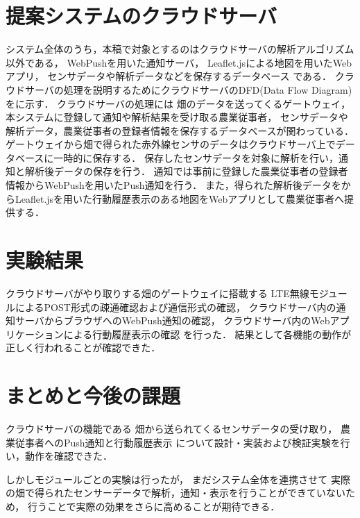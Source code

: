 \documentclass[twocolumn,platex,10pt]{yokou}
\begin{document}
\section{提案システムのクラウドサーバ}
システム全体のうち，本稿で対象とするのはクラウドサーバの解析アルゴリズム以外である，
WebPushを用いた通知サーバ，
Leaflet.jsによる地図を用いたWebアプリ，
センサデータや解析データなどを保存するデータベース
である．
クラウドサーバの処理を説明するためにクラウドサーバのDFD(Data Flow Diagram)をに示す．
クラウドサーバの処理には
畑のデータを送ってくるゲートウェイ，
本システムに登録して通知や解析結果を受け取る農業従事者，
センサデータや解析データ，農業従事者の登録者情報を保存するデータベースが関わっている．
ゲートウェイから畑で得られた赤外線センサのデータはクラウドサーバ上でデータベースに一時的に保存する．
保存したセンサデータを対象に解析を行い，通知と解析後データの保存を行う．
通知では事前に登録した農業従事者の登録者情報からWebPushを用いたPush通知を行う．
また，得られた解析後データをからLeaflet.jsを用いた行動履歴表示のある地図をWebアプリとして農業従事者へ提供する．


\section{実験結果}
クラウドサーバがやり取りする畑のゲートウェイに搭載する
LTE無線モジュールによるPOST形式の疎通確認および通信形式の確認，
クラウドサーバ内の通知サーバからブラウザへのWebPush通知の確認，
クラウドサーバ内のWebアプリケーションによる行動履歴表示の確認
を行った．
結果として各機能の動作が正しく行われることが確認できた．

\section{まとめと今後の課題}
クラウドサーバの機能である
畑から送られてくるセンサデータの受け取り，
農業従事者へのPush通知と行動履歴表示
について設計・実装および検証実験を行い，動作を確認できた．

しかしモジュールごとの実験は行ったが，
まだシステム全体を連携させて
実際の畑で得られたセンサーデータで解析，通知・表示を行うことができていないため，
行うことで実際の効果をさらに高めることが期待できる．




\end{document}
